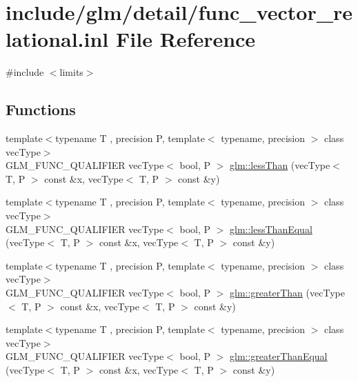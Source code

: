 \hypertarget{func__vector__relational_8inl}{}\section{include/glm/detail/func\+\_\+vector\+\_\+relational.inl File Reference}
\label{func__vector__relational_8inl}
{\ttfamily \#include $<$limits$>$}\newline
\subsection*{Functions}
\begin{DoxyCompactItemize}
\item 
{\footnotesize template$<$typename T , precision P, template$<$ typename, precision $>$ class vec\+Type$>$ }\\G\+L\+M\+\_\+\+F\+U\+N\+C\+\_\+\+Q\+U\+A\+L\+I\+F\+I\+ER vec\+Type$<$ bool, P $>$ \hyperlink{group__core__func__vector__relational_ga6261970937a70b0b747ae0d3ade1c188}{glm\+::less\+Than} (vec\+Type$<$ T, P $>$ const \&x, vec\+Type$<$ T, P $>$ const \&y)
\item 
{\footnotesize template$<$typename T , precision P, template$<$ typename, precision $>$ class vec\+Type$>$ }\\G\+L\+M\+\_\+\+F\+U\+N\+C\+\_\+\+Q\+U\+A\+L\+I\+F\+I\+ER vec\+Type$<$ bool, P $>$ \hyperlink{group__core__func__vector__relational_gaaf1d88119f11200c32011de7c5ec0102}{glm\+::less\+Than\+Equal} (vec\+Type$<$ T, P $>$ const \&x, vec\+Type$<$ T, P $>$ const \&y)
\item 
{\footnotesize template$<$typename T , precision P, template$<$ typename, precision $>$ class vec\+Type$>$ }\\G\+L\+M\+\_\+\+F\+U\+N\+C\+\_\+\+Q\+U\+A\+L\+I\+F\+I\+ER vec\+Type$<$ bool, P $>$ \hyperlink{group__core__func__vector__relational_gadd80263161a308462d3e3e287e79cccd}{glm\+::greater\+Than} (vec\+Type$<$ T, P $>$ const \&x, vec\+Type$<$ T, P $>$ const \&y)
\item 
{\footnotesize template$<$typename T , precision P, template$<$ typename, precision $>$ class vec\+Type$>$ }\\G\+L\+M\+\_\+\+F\+U\+N\+C\+\_\+\+Q\+U\+A\+L\+I\+F\+I\+ER vec\+Type$<$ bool, P $>$ \hyperlink{group__core__func__vector__relational_gaee7e101f8cc4ea43924f14dcdeb2ef26}{glm\+::greater\+Than\+Equal} (vec\+Type$<$ T, P $>$ const \&x, vec\+Type$<$ T, P $>$ const \&y)

\end{DoxyCompactItemize}
